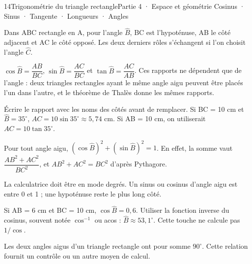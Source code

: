\begin{ouverture}[geometrie]{14}{Trigonométrie du triangle rectangle}{Partie 4 · Espace et géométrie}
{Cosinus · Sinus · Tangente · Longueurs · Angles}
\end{ouverture}
\pagestyle{otMain}\essentiel\fontsize{11}{15}\selectfont
{}
\begin{definition}Dans ABC rectangle en A, pour l’angle $\widehat B$, BC est l’hypoténuse, AB le côté adjacent et AC le côté opposé. Les deux derniers rôles s’échangent si l’on choisit l’angle $\widehat C$.\end{definition}
\begin{propriete}$\cos\widehat B=\dfrac{AB}{BC}$, $\sin\widehat B=\dfrac{AC}{BC}$ et $\tan\widehat B=\dfrac{AC}{AB}$. Ces rapports ne dépendent que de l’angle : deux triangles rectangles ayant le même angle aigu peuvent être placés l’un dans l’autre, et le théorème de Thalès donne les mêmes rapports.\end{propriete}
\begin{savoirfaire}Écrire le rapport avec les noms des côtés avant de remplacer. Si BC = 10 cm et $\widehat B=35^\circ$, $AC=10\sin35^\circ\approx5{,}74$ cm. Si AB = 10 cm, on utiliserait $AC=10\tan35^\circ$.\end{savoirfaire}
\begin{propriete}Pour tout angle aigu, $(\cos\widehat B)^2+(\sin\widehat B)^2=1$. En effet, la somme vaut $\dfrac{AB^2+AC^2}{BC^2}$, et $AB^2+AC^2=BC^2$ d’après Pythagore.\end{propriete}
\begin{attention}La calculatrice doit être en mode degrés. Un sinus ou cosinus d’angle aigu est entre 0 et 1 ; une hypoténuse reste le plus long côté.\end{attention}
\clearpage
{}
\begin{savoirfaire}Si AB = 6 cm et BC = 10 cm, $\cos\widehat B=0{,}6$. Utiliser la fonction inverse du cosinus, souvent notée $\cos^{-1}$ ou acos : $\widehat B\approx53{,}1^\circ$. Cette touche ne calcule pas $1/\cos$.\end{savoirfaire}
\begin{propriete}Les deux angles aigus d’un triangle rectangle ont pour somme $90^\circ$. Cette relation fournit un contrôle ou un autre moyen de calcul.\end{propriete}
